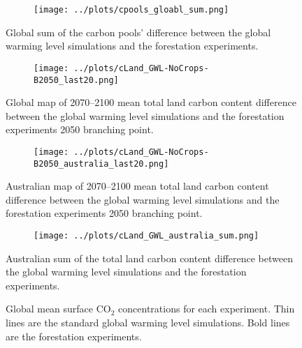 \documentclass[]{article}
\begin{document}
\begin{figure}[H]
    \centering
    \begin{subfigure}[b]{\linewidth}
        \texttt{[image: ../plots/cpools\_gloabl\_sum.png]}
    \end{subfigure}
    \caption{Global sum of the carbon pools' difference between the global warming level simulations and the forestation experiments.}
    \label{fig:global_cpools}
\end{figure}

\begin{figure}[H]
    \centering
    \begin{subfigure}[b]{\linewidth}
        \texttt{[image: ../plots/cLand\_GWL-NoCrops-B2050\_last20.png]}
    \end{subfigure}
    \caption{Global map of 2070--2100 mean total land carbon content difference between the global warming level simulations and the forestation experiments 2050 branching point.}
    \label{fig:map_cLand}
\end{figure}

\begin{figure}[H]
    \centering
    \begin{subfigure}[b]{\linewidth}
        \texttt{[image: ../plots/cLand\_GWL-NoCrops-B2050\_australia\_last20.png]}
    \end{subfigure}
    \caption{Australian map of 2070--2100 mean total land carbon content difference between the global warming level simulations and the forestation experiments 2050 branching point.}
    \label{fig:aus_map_cLand}
\end{figure}

\begin{figure}[H]
    \centering
    \begin{subfigure}[b]{\linewidth}
        \texttt{[image: ../plots/cLand\_GWL\_australia\_sum.png]}
    \end{subfigure}
    \caption{Australian sum of the total land carbon content difference between the global warming level simulations and the forestation experiments.}
    \label{fig:australia_cLand}
\end{figure}

\begin{figure}[H]
    \centering
    \begin{subfigure}[b]{\linewidth}
        
    \end{subfigure}
    \caption{Global mean surface CO$_2$ concentrations for each experiment. Thin lines are the standard global warming level simulations. Bold lines are the forestation experiments.}
    \label{fig:global_co2}
\end{figure}
\end{document}
